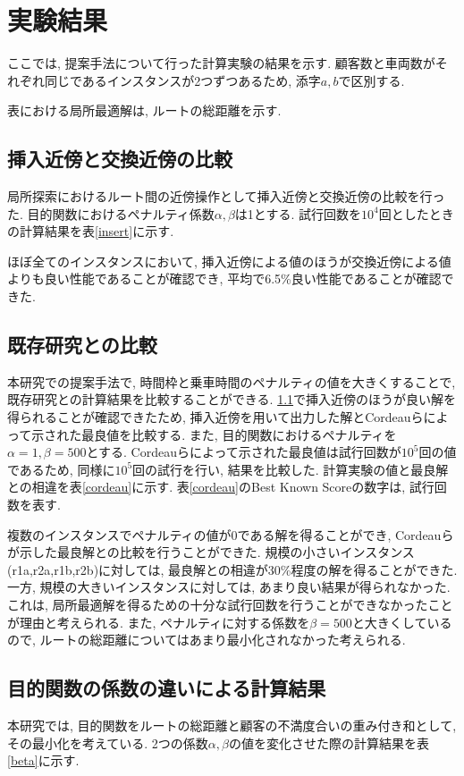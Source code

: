 \section{実験結果}
ここでは, 提案手法について行った計算実験の結果を示す.
顧客数と車両数がそれぞれ同じであるインスタンスが2つずつあるため, 添字$a,b$で区別する.

表における局所最適解は, ルートの総距離を示す.
\subsection{挿入近傍と交換近傍の比較}
\label{sec:insert}
局所探索におけるルート間の近傍操作として挿入近傍と交換近傍の比較を行った.
目的関数におけるペナルティ係数$\alpha,\beta$は1とする.
試行回数を$10^4$回としたときの計算結果を表\ref{insert}に示す.

ほぼ全てのインスタンスにおいて, 挿入近傍による値のほうが交換近傍による値よりも良い性能であることが確認でき, 平均で6.5\%良い性能であることが確認できた.

\subsection{既存研究との比較}
\label{sec:cordeau}
本研究での提案手法で, 時間枠と乗車時間のペナルティの値を大きくすることで, 既存研究との計算結果を比較することができる. \ref{sec:insert}で挿入近傍のほうが良い解を得られることが確認できたため, 挿入近傍を用いて出力した解とCordeauらによって示された最良値を比較する. また, 目的関数におけるペナルティを$\alpha=1,\beta=500$とする.
Cordeauらによって示された最良値は試行回数が$10^5$回の値であるため, 同様に$10^5$回の試行を行い, 結果を比較した. 計算実験の値と最良解との相違を表\ref{cordeau}に示す. 表\ref{cordeau}のBest Known Scoreの数字は, 試行回数を表す.

複数のインスタンスでペナルティの値が0である解を得ることができ, Cordeauらが示した最良解との比較を行うことができた.
規模の小さいインスタンス(r1a,r2a,r1b,r2b)に対しては, 最良解との相違が30\%程度の解を得ることができた. 一方, 規模の大きいインスタンスに対しては, あまり良い結果が得られなかった. これは, 局所最適解を得るための十分な試行回数を行うことができなかったことが理由と考えられる. また, ペナルティに対する係数を$\beta=500$と大きくしているので, ルートの総距離についてはあまり最小化されなかった考えられる.
\subsection{目的関数の係数の違いによる計算結果}
本研究では, 目的関数をルートの総距離と顧客の不満度合いの重み付き和として, その最小化を考えている. 2つの係数$\alpha,\beta$の値を変化させた際の計算結果を表\ref{beta}に示す.

